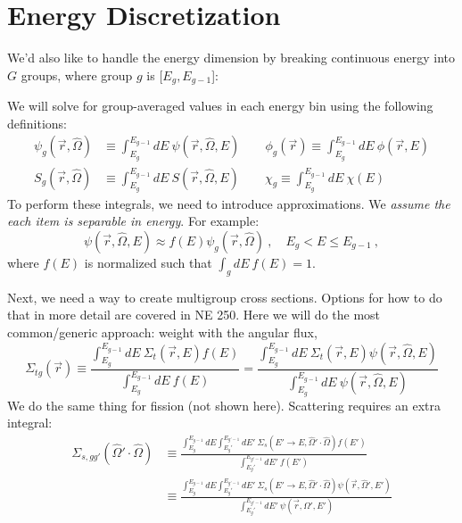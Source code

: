 \documentclass[12pt]{article}
\newcommand{\rvec}{\ensuremath{\vec{r}}}
\newcommand{\vOmega}{\ensuremath{\hat{\Omega}}}
\begin{document}
\section*{Energy Discretization}
We'd also like to handle the energy dimension by breaking continuous energy into $G$ groups, where group $g$ is [$E_{g}, E_{g-1}$]:
\begin{center}
\end{center}
%
We will solve for group-averaged values in each energy bin using the following definitions:
\begin{align*}
\psi_g(\rvec, \vOmega) &\equiv \int_{E_g}^{E_{g-1}} dE\: \psi(\rvec, \vOmega, E) \qquad
\phi_g(\rvec) \equiv \int_{E_g}^{E_{g-1}} dE\: \phi(\rvec,  E)\\
S_g(\rvec, \vOmega) &\equiv \int_{E_g}^{E_{g-1}} dE\: S(\rvec, \vOmega, E) \qquad
\chi_g \equiv \int_{E_g}^{E_{g-1}} dE\: \chi(E)
\end{align*}
%
To perform these integrals, we need to introduce approximations. We \textit{assume the each item is separable in energy}. For example:
\[
\psi(\vec{r}, \vOmega, E) \approx f(E)\psi_g(\vec{r}, \vOmega)\:, \quad E_g < E \leq E_{g-1}\:,
\]
where $f(E)$ is normalized such that $\int_g dE\: f(E) = 1$.

Next, we need a way to create multigroup cross sections. Options for how to do that in more detail are covered in NE 250. Here we will do the most common/generic approach: weight with the angular flux,
\[\Sigma_{tg}(\vec{r}) \equiv \frac{\int_{E_g}^{E_{g-1}} dE\: \Sigma_t(\rvec, E) f(E)}{\int_{E_g}^{E_{g-1}} dE\: f(E)} = \frac{\int_{E_g}^{E_{g-1}} dE\: \Sigma_t(\rvec, E) \psi(\rvec, \vOmega, E)}{\int_{E_g}^{E_{g-1}} dE\: \psi(\rvec, \vOmega, E)}\]
We do the same thing for fission (not shown here). Scattering requires an extra integral:
\begin{align*}
\Sigma_{s,gg'}(\vOmega' \cdot \vOmega) & \equiv \frac{\int_{E_g}^{E_{g-1}} dE \int_{E_g'}^{E_{g'-1}} dE' \: \Sigma_s(E'\rightarrow E, \vOmega' \cdot \vOmega) f(E')}{\int_{E_g'}^{E_{g'-1}} dE' \: f(E')}\\
& \equiv \frac{\int_{E_g}^{E_{g-1}} dE \int_{E_g'}^{E_{g'-1}} dE' \: \Sigma_s(E'\rightarrow E, \vOmega' \cdot \vOmega) \psi(\rvec, \vOmega', E')}{\int_{E_g'}^{E_{g'-1}} dE' \: \psi(\rvec, \vOmega', E')}
\end{align*}
\end{document}
